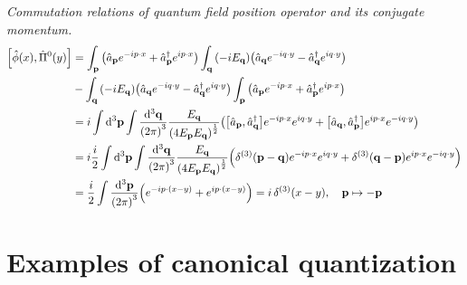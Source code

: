 \documentclass{report}
\begin{document}
\begin{subquests}
	\item \emph{Commutation relations of quantum field position operator and its conjugate momentum.} 
	\begin{align*}
		\bqty{\hat{\phi}(x),\hat{\Pi}^0(y)} & = \int_{\mathbf p} \pqty{\hat{a}_{\vb p}e^{-i p \cdot x} + \hat{a}^{\dagger}_{\vb p}e^{i p \cdot x}}\int _{\mathbf q}\pqty{-iE_{\vb q}}\pqty{\hat{a}_{\vb q}e^{-i q \cdot y} - \hat{a}^{\dagger}_{\vb q}e^{i q \cdot y}} \\
		& -\int _{\mathbf q}\pqty{-iE_{\vb q}}\pqty{\hat{a}_{\vb q}e^{-i q \cdot y} - \hat{a}^{\dagger}_{\vb q}e^{i q \cdot y}}\int_{\mathbf p} \pqty{\hat{a}_{\vb p}e^{-i p \cdot x} + \hat{a}^{\dagger}_{\vb p}e^{i p \cdot x}} \\
		& = i\int \dd^3{\vb p}\int \frac{\dd^3{\vb q}}{\pqty{2\pi}^3}\frac{E_{\vb q}}{\pqty{4E_{\vb p}E_{\vb q}}^{\frac{1}{2}}}\pqty{\bqty{\hat{a}_{\vb p},\hat{a}^{\dagger}_{\vb q}}e^{-i p \cdot x}e^{i q \cdot y} + \bqty{\hat{a}_{\vb q},\hat{a}^{\dagger}_{\vb p}}e^{i p \cdot x}e^{-i q \cdot y}} \\
		& = i\frac{i}{2}\int \dd^3{\vb p}\int \frac{\dd^3{\vb q}}{\pqty{2\pi}^3}\frac{E_{\vb q}}{\pqty{4E_{\vb p}E_{\vb q}}^{\frac{1}{2}}}\pqty{\delta^{(3)}\pqty{\vb p - \vb q}e^{-i p \cdot x}e^{i q \cdot y} + \delta^{(3)}\pqty{\vb q - \vb p}e^{i p \cdot x}e^{-i q \cdot y}} \\
		& = \frac{i}{2}\int\frac{\dd^3{\vb p}}{\pqty{2\pi}^3}\pqty{e^{-i p \cdot (x-y)} + e^{i p \cdot (x-y)}} = i\,\delta^{(3)}(x - y), \quad \vb p \mapsto -\vb p
	\end{align*}
\end{subquests}

\chapter{Examples of canonical quantization}
\end{document}
